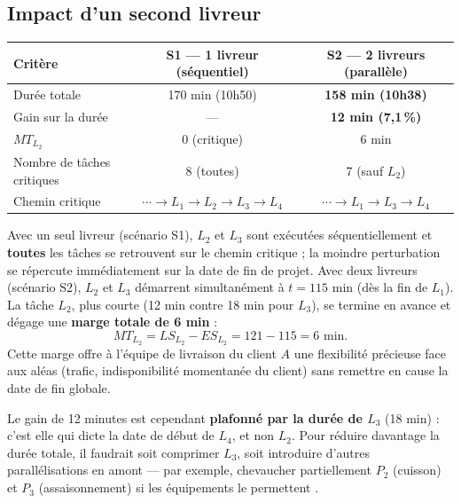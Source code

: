 \documentclass[12pt,a4paper]{article}
\begin{document}
\subsection{Impact d'un second livreur}

\begin{center}\small
\begin{tabular}{lcc}
\toprule
\textbf{Critère} & \textbf{S1 — 1 livreur (séquentiel)} & \textbf{S2 — 2 livreurs (parallèle)}\\
\midrule
Durée totale                  & 170 min (10h50) & \textbf{158 min (10h38)}\\
Gain sur la durée             & — & \textbf{12 min (7,1\,\%)}\\
$MT_{L_2}$                    & 0 (critique)    & 6 min\\
Nombre de tâches critiques    & 8 (toutes)      & 7 (sauf $L_2$)\\
Chemin critique               & $\cdots\to L_1\to L_2\to L_3\to L_4$
                              & $\cdots\to L_1\to L_3\to L_4$\\
\bottomrule
\end{tabular}
\end{center}

\medskip

Avec un seul livreur (scénario S1), $L_2$ et $L_3$ sont exécutées séquentiellement et
\textbf{toutes} les tâches se retrouvent sur le chemin critique ; la moindre
perturbation se répercute immédiatement sur la date de fin de projet. Avec deux
livreurs (scénario S2), $L_2$ et $L_3$ démarrent simultanément à $t = 115$ min (dès
la fin de $L_1$). La tâche $L_2$, plus courte (12 min contre 18 min pour $L_3$), se
termine en avance et dégage une \textbf{marge totale de 6 min} :
\[
MT_{L_2} = LS_{L_2} - ES_{L_2} = 121 - 115 = 6 \text{ min.}
\]
Cette marge offre à l'équipe de livraison du client $A$ une flexibilité précieuse face
aux aléas (trafic, indisponibilité momentanée du client) sans remettre en cause la date
de fin globale.

Le gain de 12 minutes est cependant \textbf{plafonné par la durée de $L_3$} (18 min) :
c'est elle qui dicte la date de début de $L_4$, et non $L_2$. Pour réduire davantage
la durée totale, il faudrait soit comprimer $L_3$, soit introduire d'autres
parallélisations en amont --- par exemple, chevaucher partiellement $P_2$ (cuisson) et
$P_3$ (assaisonnement) si les équipements le permettent
\cite{cours4GI_ordonnancement}.
\end{document}
